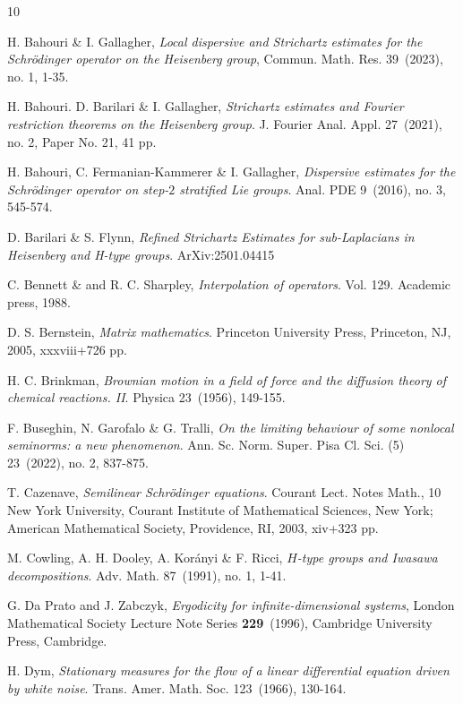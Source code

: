 \documentclass[11pt,letter]{amsart}
\numberwithin{equation}{section}
\numberwithin{equation}{section}
\begin{document}
\begin{thebibliography}{10}


H. Bahouri \& I. Gallagher, \emph{Local dispersive and Strichartz estimates for the Schr\"odinger operator on the Heisenberg group},
Commun. Math. Res. 39~(2023), no. 1, 1-35.


H. Bahouri. D. Barilari \& I. Gallagher, \emph{ Strichartz estimates and Fourier restriction theorems on the Heisenberg group}.
J. Fourier Anal. Appl. 27~(2021), no. 2, Paper No. 21, 41 pp.

H. Bahouri, C. Fermanian-Kammerer \& I. Gallagher, \emph{Dispersive estimates for the Schr\"odinger operator on step-$2$ stratified Lie groups}.
Anal. PDE 9~(2016), no. 3, 545-574.

D. Barilari \& S. Flynn, \emph{Refined Strichartz Estimates for sub-Laplacians in Heisenberg and H-type groups}. ArXiv:2501.04415

C. Bennett \& and R. C. Sharpley, \emph{Interpolation of operators}. Vol. 129. Academic press, 1988.

D. S. Bernstein, \emph{Matrix mathematics}.
Princeton University Press, Princeton, NJ, 2005, xxxviii+726 pp.

H. C. Brinkman, \emph{Brownian motion in a field of force and the diffusion theory of chemical reactions. II}. Physica 23~(1956), 149-155.

F. Buseghin, N. Garofalo \& G. Tralli, \emph{On the limiting behaviour of some nonlocal seminorms: a new phenomenon}.
Ann. Sc. Norm. Super. Pisa Cl. Sci. (5) 23~(2022), no. 2, 837-875.


 T. Cazenave, \emph{Semilinear Schr\"odinger equations}. Courant Lect. Notes Math., 10
New York University, Courant Institute of Mathematical Sciences, New York; American Mathematical Society, Providence, RI, 2003, xiv+323 pp.

M. Cowling, A. H. Dooley, A. Kor\'anyi \& F. Ricci, \emph{$H$-type groups and Iwasawa decompositions}. Adv. Math. 87~(1991), no. 1, 1-41.


G. Da Prato and J. Zabczyk, \emph{Ergodicity for infinite-dimensional systems}, London Mathematical Society Lecture Note Series \textbf{229}~(1996), Cambridge University Press, Cambridge.

H. Dym, 
\emph{Stationary measures for the flow of a linear differential equation driven by white noise}.
Trans. Amer. Math. Soc. 123~(1966), 130-164.


\end{thebibliography}
\end{document}

